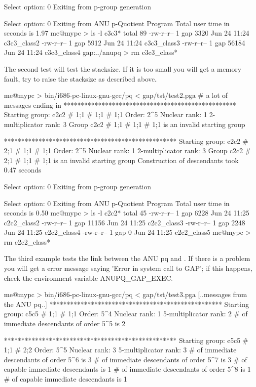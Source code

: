     Select option: 0 
    Exiting from p-group generation

    Select option: 0 
    Exiting from ANU p-Quotient Program
    Total user time in seconds is 1.97
    me@mypc > ls -l c3c3*
    total 89
    -rw-r--r--    1 gap    3320 Jun 24 11:24 c3c3_class2
    -rw-r--r--    1 gap    5912 Jun 24 11:24 c3c3_class3
    -rw-r--r--    1 gap   56184 Jun 24 11:24 c3c3_class4
    gap:../anupq > rm c3c3_class*
\endtt

The second test will test the stacksize. If it is too small you will  get
a memory fault, try to raise the stacksize as described above.

\begintt
    me@mypc > bin/i686-pc-linux-gnu-gcc/pq < gap/tst/test2.pga
    # a lot of messages ending in
    **************************************************
    Starting group: c2c2 # 1;1 # 1;1 # 1;1
    Order: 2^5
    Nuclear rank: 1
    2-multiplicator rank: 3
    Group c2c2 # 1;1 # 1;1 # 1;1 is an invalid starting group

    **************************************************
    Starting group: c2c2 # 2;1 # 1;1 # 1;1
    Order: 2^5
    Nuclear rank: 1
    2-multiplicator rank: 3
    Group c2c2 # 2;1 # 1;1 # 1;1 is an invalid starting group
    Construction of descendants took 0.47 seconds

    Select option: 0 
    Exiting from p-group generation

    Select option: 0 
    Exiting from ANU p-Quotient Program
    Total user time in seconds is 0.50
    me@mypc > ls -l c2c2*
    total 45
    -rw-r--r--    1 gap   6228 Jun 24 11:25 c2c2_class2
    -rw-r--r--    1 gap  11156 Jun 24 11:25 c2c2_class3
    -rw-r--r--    1 gap   2248 Jun 24 11:25 c2c2_class4
    -rw-r--r--    1 gap      0 Jun 24 11:25 c2c2_class5
    me@mypc > rm c2c2_class*
\endtt

The third example tests the link between the ANU pq and {\GAP}.  If there
is a problem you will get a error message saying
'Error in  system  call  to GAP';  if this happens, check the environment
variable ANUPQ\_GAP\_EXEC.

\begintt
    me@mypc > bin/i686-pc-linux-gnu-gcc/pq < gap/tst/test3.pga
    [..messages from the ANU pq..]
    **************************************************
    Starting group: c5c5 # 1;1 # 1;1
    Order: 5^4
    Nuclear rank: 1
    5-multiplicator rank: 2
    # of immediate descendants of order 5^5 is 2

    **************************************************
    Starting group: c5c5 # 1;1 # 2;2
    Order: 5^5
    Nuclear rank: 3
    5-multiplicator rank: 3
    # of immediate descendants of order 5^6 is 3
    # of immediate descendants of order 5^7 is 3
    # of capable immediate descendants is 1
    # of immediate descendants of order 5^8 is 1
    # of capable immediate descendants is 1

